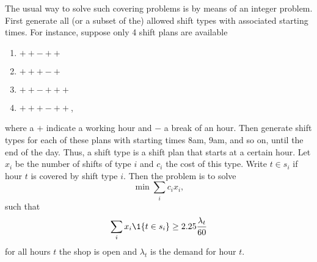 The usual way to solve such  covering problems is by means of an integer
problem. First generate all (or a subset of the) allowed shift types
with associated starting times. For instance, suppose only 4 shift
plans are available
\begin{enumerate}
\item $++-++$
\item $+++-+$
\item $++-+++$
\item $+++-++$,
\end{enumerate}
where a $+$ indicate a working hour and $-$ a break of an hour. Then
generate shift types for each of these plans with starting times
$8$am, $9$am, and so on, until the end of the day. Thus, a shift type
is a shift plan that starts at a certain hour. Let $x_i$ be the number
of shifts of type $i$ and $c_i$ the cost of this type. Write $t\in s_i$ if
hour $t$ is covered by shift type $i$.  Then the problem is to solve
\begin{equation*}
  \min \sum_i c_i x_i,
\end{equation*}
such that 
\begin{equation*}
  \sum_i x_i \1{t \in s_i} \geq 2.25 \frac{\lambda_t}{60}
\end{equation*}
for all hours $t$ the shop is open and $\lambda_t$ is the demand for
hour $t$.








